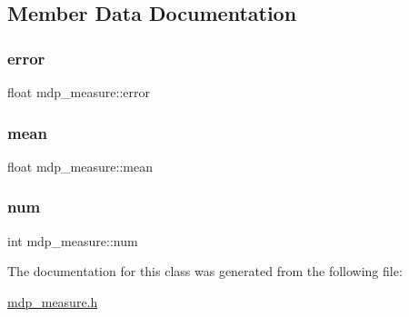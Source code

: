 \subsection{Member Data Documentation}
\mbox{\label{classmdp__measure_ac0e564a7fdfa4785e8ca77569a2c37e4}} 
\subsubsection{\texorpdfstring{error}{error}}
{\footnotesize\ttfamily float mdp\+\_\+measure\+::error}

\mbox{\label{classmdp__measure_a105996437f8864a761c17dfa308a73f0}} 
\subsubsection{\texorpdfstring{mean}{mean}}
{\footnotesize\ttfamily float mdp\+\_\+measure\+::mean}

\mbox{\label{classmdp__measure_aca5ab38b4f8c43639b2754947c4e4b25}} 
\subsubsection{\texorpdfstring{num}{num}}
{\footnotesize\ttfamily int mdp\+\_\+measure\+::num}



The documentation for this class was generated from the following file\+:\begin{DoxyCompactItemize}
\item 
\hyperlink{mdp__measure_8h}{mdp\+\_\+measure.\+h}\end{DoxyCompactItemize}
